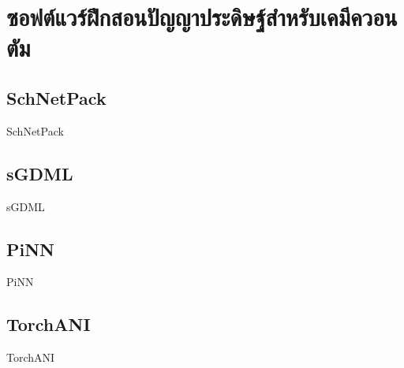 

\chapter{ซอฟต์แวร์ฝึกสอนปัญญาประดิษฐ์สำหรับเคมีควอนตัม}
\label{ch:ml_lib}

\section{SchNetPack}

SchNetPack\cite{schutt2019}

\section{sGDML}

sGDML\cite{chmiela2019}

\section{PiNN}

PiNN\cite{shao2020}

\section{TorchANI}

TorchANI\cite{gao2020}
